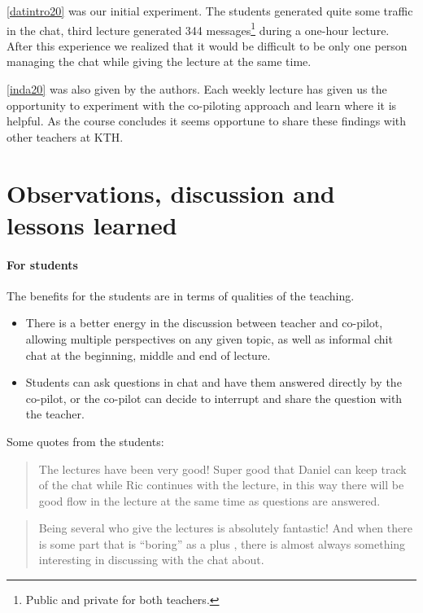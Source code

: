 \documentclass[sigconf]{acmart}
\begin{document}
\ref{datintro20} was our initial experiment.
The students generated quite some traffic in the chat, \eg third lecture generated
344
messages\footnote{%
  Public and private for both teachers.
} during a one-hour lecture.
After this experience we realized that it would be difficult to be only one 
person managing the chat while giving the lecture at the same time.

\ref{inda20} was also given by the authors.
Each weekly lecture has given us the opportunity to experiment with the 
co-piloting approach and learn where it is helpful.
As the course concludes it seems opportune to share these findings with other 
teachers at KTH.


\section*{Observations, discussion and lessons learned}

\paragraph{For students}

The benefits for the students are in terms of qualities of the teaching.

\begin{itemize}
  \item There is a better energy in the discussion between teacher and 
    co-pilot, allowing multiple perspectives on any given topic, as well as 
    informal chit chat at the beginning, middle and end of lecture.

  \item Students can ask questions in chat and have them answered directly by 
    the co-pilot, or the co-pilot can decide to interrupt and share the 
    question with the teacher.
\end{itemize}

Some quotes from the students:
\begin{quote}
The lectures have been very good! Super good that Daniel can keep track of
the chat while Ric continues with the lecture, in this way there will be
good flow in the lecture at the same time as questions are answered.
\end{quote}

\begin{quote}
Being several who give the lectures is absolutely fantastic! And when there
is some part that is \enquote{boring} as a plus , there is almost always something
interesting in discussing with the chat about.
\end{quote}
\end{document}
